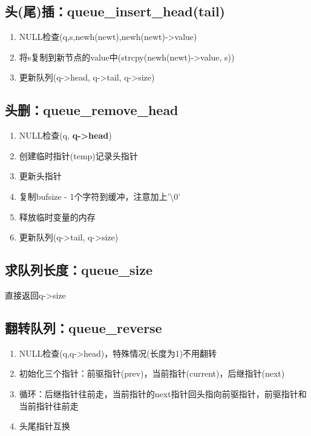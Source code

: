 \documentclass[12pt, a4paper, oneside]{ctexart}
\begin{document}
\subsection{头(尾)插：queue\_insert\_head(tail)}
\begin{enumerate}
    \item NULL检查(q,s,newh(newt),newh(newt)-\textgreater value)
    \item 将s复制到新节点的value中(strcpy(newh(newt)-\textgreater value, s))
    \item 更新队列(q-\textgreater head, q-\textgreater tail, q-\textgreater size)
\end{enumerate}
\subsection{头删：queue\_remove\_head}
\begin{enumerate}
    \item NULL检查(q, \textbf{q-\textgreater head})
    \item 创建临时指针(temp)记录头指针
    \item 更新头指针
    \item 复制bufsize - 1个字符到缓冲，注意加上'\textbackslash 0'
    \item 释放临时变量的内存
    \item 更新队列(q-\textgreater tail, q-\textgreater size)
\end{enumerate}
\subsection{求队列长度：queue\_size}
直接返回q-\textgreater size
\subsection{翻转队列：queue\_reverse}
\begin{enumerate}
    \item NULL检查(q,q-\textgreater head)，特殊情况(长度为1)不用翻转
    \item 初始化三个指针：前驱指针(prev)，当前指针(current)，后继指针(next)
    \item 循环：后继指针往前走，当前指针的next指针回头指向前驱指针，前驱指针和当前指针往前走
    \item 头尾指针互换
\end{enumerate}
\end{document}
